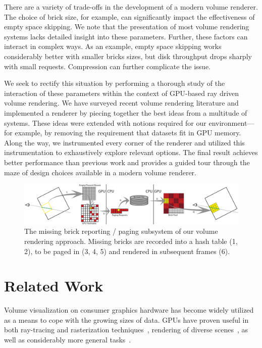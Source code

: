 There are a variety of trade-offs in the development of a modern volume
renderer.  The choice of brick size, for example, can significantly
impact the effectiveness of empty space skipping.  We note that the
presentation of most volume rendering systems lacks detailed insight
into these parameters.  Further, these factors can interact in complex
ways.  As an example, empty space skipping works considerably better
with smaller bricks sizes, but disk throughput drops sharply with small
requests.  Compression can further complicate the issue.

We seek to rectify this situation by performing a thorough study of
the interaction of these parameters within the context of GPU-based
ray driven volume rendering.  We have surveyed recent volume rendering
literature and implemented a renderer by piecing together the best
ideas from a multitude of systems. These ideas were extended with
notions required for our environment---for example, by removing
the requirement that datasets fit in GPU memory.  Along the way,
we instrumented every corner of the renderer and utilized this
instrumentation to exhaustively explore relevant options.  The final
result achieves better performance than previous work and provides a
guided tour through the maze of design choices available in a modern
volume renderer.

\begin{figure}
  \centering
  \includegraphics[width=1.00\linewidth]{images/rg/pipeline.pdf}
  \caption{The missing brick reporting / paging subsystem of our volume
  rendering approach.  Missing bricks are recorded into a hash table
  (1, 2), to be paged in (3, 4, 5) and rendered in subsequent frames
  (6).}
  \label{fig:flow}
\end{figure}

\section{Related Work}

Volume visualization on consumer graphics hardware has become widely
utilized as a means to cope with the growing sizes of data.  GPUs have
proven useful in both ray-tracing and rasterization
techniques~\cite{Reichl:2012:HybridSurface, Dick:2009:Terrain},
rendering of diverse scenes~\cite{Parker:2010:Optix}, as well
as considerably more general tasks~\cite{Owens:2007:GPGPU}.


